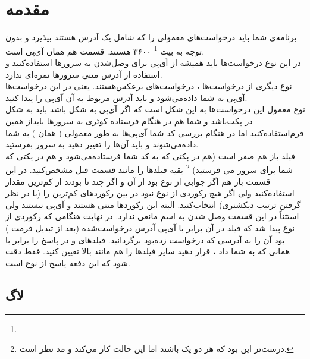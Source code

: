 \documentclass{article}
\begin{document}
	\subsection{}
    \section{مقدمه}
    برنامه‌ی شما باید درخواست‌های معمولی را که شامل یک آدرس‌ هستند بپذیرد و بدون توجه به بیت 
     \footnote{}
    ۳۶۰۰
    هستند.
    قسمت
    هم همان آی‌پی است.
    \\
    در این نوع درخواست‌ها باید همیشه از آی‌پی برای وصل‌شدن به سرور‌ها استفاده‌کنید و استفاده از آدرس متنی سرور‌ها نمر‌ه‌ای ندارد.
    \\
    نوع دیگری از درخواست‌ها ، درخواست‌های برعکس‌هستند. یعنی در این درخواست‌ها آی‌پی به شما داده‌می‌شود و باید آدرس مربوط به آن آی‌پی را پیدا کنید.
    \\
    نوع معمول این درخواست‌ها به این شکل است که اگر آی‌پی به شکل 
    باشد 
    باید به شکل 
    در پکت‌باشد و شما هم در هنگام فرستاده کو‌ئری به سرور‌ها بایداز همین فرم‌استفاده‌کنید اما در هنگام بررسی کد شما ‌آی‌پی‌ها به طور معمولی
    (
        همان
    )
    به شما داده‌می‌شوند
    و باید آن‌ها را تغییر دهید به سرور بفرستید.
    \\
    فیلد
    باز هم صفر است (هم در پکتی که به کد شما فرستاده‌می‌شود و هم در پکتی که شما برای سرور می فرستید)
    \footnote{ درست‌تر این بود که هر دو یک باشند اما این حالت کار می‌کند و مد نظر است.}
    بقیه فیلد‌ها را مانند قسمت قبل مشخص‌کنید.
    در این قسمت باز هم اگر جوابی از نوع 
    بود از آن و اگر چند تا بودند از کم‌ترین مقدار استفاده‌کنید ولی اگر هیچ رکوردی از نوع 
    نبود در بین رکورد‌های 
    کم‌ترین را
    (با در نظر گرفتن ترتیب دیکشنری)
    انتخاب‌کنید. البته این رکورد‌ها متنی هستند و آی‌پی نیستند ولی استثناً در این قسمت وصل شدن به اسم مانعی ندارد.
    در نهایت هنگامی که رکوردی از نوع 
    پیدا شد که فیلد
    در آن برابر با آی‌پی آدرس درخواست‌شده (بعد از تبدیل فرمت
    )
    بود آن را به آدرسی که درخواست زده‌بود برگردانید.
    فیلدهای
    و
    در
    پاسخ را برابر با همانی که 
    به شما داد
    ،
    قرار دهید سایر فیلد‌ها را هم مانند بالا تعیین کنید. فقط دقت شود که این دفعه پاسخ از نوع 
    است.
    \subsection{لاگ}
\end{document}
